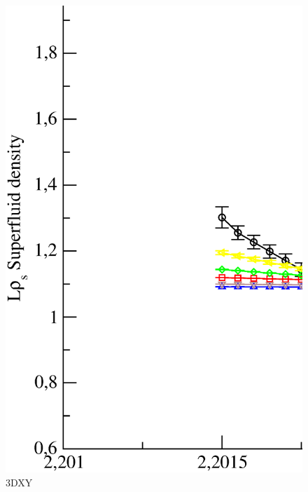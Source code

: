 \begin{figure}[!htpb]
  \centering
  \includegraphics[width=15cm]{./plots/3DXY/3DXY_SuperfluidDensity_vs_Temperature.eps}
  \caption{3DXY}
\end{figure}

